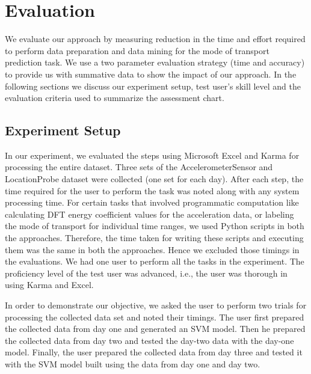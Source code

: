 \section{Evaluation}
We evaluate our approach by measuring reduction in the time and effort required to perform data preparation and data mining for the mode of transport prediction task. We use a two parameter evaluation strategy (time and accuracy) to provide us with summative data to show the impact of our approach. In the following sections we discuss our experiment setup, test user's skill level and the evaluation criteria used to summarize the assessment chart. 

\subsection{Experiment Setup}
In our experiment, we evaluated the steps using Microsoft Excel and Karma for processing the entire dataset. Three sets of the AccelerometerSensor and LocationProbe dataset were collected (one set for each day).  After each step, the time required for the user to perform the task was noted along with any system processing time. For certain tasks that involved programmatic computation like calculating DFT energy coefficient values for the acceleration data, or labeling the mode of transport for individual time ranges, we used Python scripts in both the approaches. Therefore, the time taken for writing these scripts and executing them was the same in both the approaches. Hence we excluded those timings in the evaluations. We had one user to perform all the tasks in the experiment. The proficiency level of the test user was advanced, i.e., the user was thorough in using Karma and Excel. 

In order to demonstrate our objective, we asked the user to perform two trials for processing the collected data set and noted their timings. The user first prepared the collected data from day one and generated an SVM model. Then he prepared the collected data from day two and tested the day-two data with the day-one model. Finally, the user prepared the collected data from day three and tested it with the SVM model built using the data from day one and day two. 

